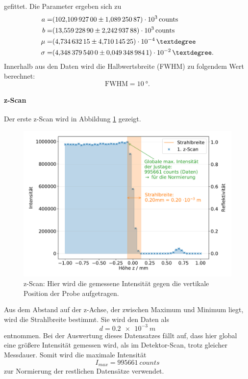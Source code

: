 gefittet.
Die Parameter ergeben sich zu
\begin{align*}
	a		= & \SI{102.109927 \pm 1.08925087 e+03}{counts} \\
	b		= & \SI{13.5592289 \pm 2.24293788 e+03}{counts} \\
	\mu 	= & \SI{4.73463215 \pm 4.71014525 e-04}{°} \\
	\sigma 	= & \SI{4.34837954 \pm 0.0493489841 e-02}{°}. \\
\end{align*}
Innerhalb aus den Daten wird die Halbwertsbreite (FWHM) zu folgendem Wert berechnet:
\begin{equation*}
	\text{FWHM} = \SI{10}{°}.
\end{equation*}


\FloatBarrier
\paragraph{z-Scan}
Der erste z-Scan wird in Abbildung \ref{fig:z} gezeigt.
\begin{figure}[H]
  \centering
  \includegraphics[width=\textwidth]{content/images/done_plot_zscan.pdf}
  \caption{z-Scan: Hier wird die gemessene Intensität gegen die vertikale Position der Probe aufgetragen.}
  \label{fig:z}
\end{figure}
Aus dem Abstand auf der z-Achse, der zwischen Maximum und Minimum liegt, wird die Strahlbreite bestimmt.
Sie wird den Daten als
\begin{equation*}
	d = \SI{0.2e-3}{m}
\end{equation*}
entnommen.
Bei der Auswertung dieses Datensatzes fällt auf, dass hier global eine größere Intensität gemessen wird, als im Detektor-Scan, trotz gleicher Messdauer.
Somit wird die maximale Intensität
\begin{equation*}
	I_{max} = \SI{995661}{counts}
\end{equation*}
zur Normierung der restlichen Datensätze verwendet.

